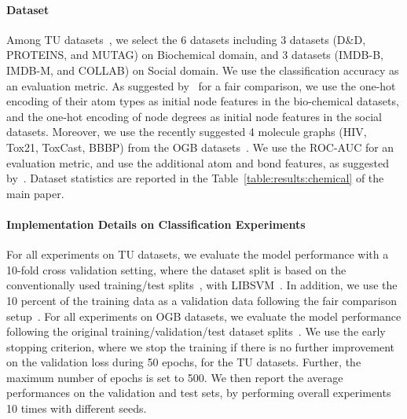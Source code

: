 \paragraph{Dataset \label{appendix/classification/data}}
Among TU datasets~\citep{classification/datasets}, we select the 6 datasets including 3 datasets (D\&D, PROTEINS, and MUTAG) on Biochemical domain, and 3 datasets (IMDB-B, IMDB-M, and COLLAB) on Social domain. We use the classification accuracy as an evaluation metric. As suggested by~\cite{fair/GNN} for a fair comparison, we use the one-hot encoding of their atom types as initial node features in the bio-chemical datasets, and the one-hot encoding of node degrees as initial node features in the social datasets. Moreover, we use the recently suggested 4 molecule graphs (HIV, Tox21, ToxCast, BBBP) from the OGB datasets~\citep{OGB}. We use the ROC-AUC for an evaluation metric, and use the additional atom and bond features, as suggested by~\citet{OGB}. Dataset statistics are reported in the Table~\ref{table:results:chemical} of the main paper.

\paragraph{Implementation Details on Classification Experiments \label{appendix/classification/implementation}}
For all experiments on TU datasets, we evaluate the model performance with a 10-fold cross validation setting, where the dataset split is based on the conventionally used training/test splits~\citep{TUdataset/split, SortPool, GIN}, with LIBSVM~\citep{LIBSVM}. In addition, we use the 10 percent of the training data as a validation data following the fair comparison setup~\citep{fair/GNN}. For all experiments on OGB datasets, we evaluate the model performance following the original training/validation/test dataset splits~\citep{OGB}. We use the early stopping criterion, where we stop the training if there is no further improvement on the validation loss during 50 epochs, for the TU datasets. Further, the maximum number of epochs is set to 500. We then report the average performances on the validation and test sets, by performing overall experiments 10 times with different seeds.

